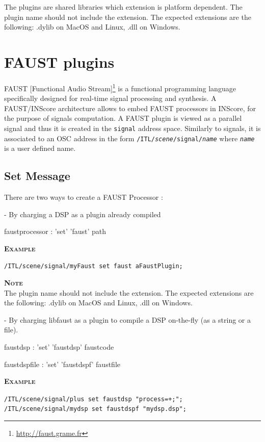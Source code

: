 \documentclass[a4paper,twoside]{report}
\newcommand{\sublevel}[1]	{\section{#1}}
\newcommand{\subsublevel}[1]	{\subsection{#1}}
\newcommand{\OSC}[1]		{\texttt{#1}}
\newcommand{\example}		{\textbf{\hspace{-1.5cm}\textbf{\textsc{Example }}}}
\newcommand{\note}	[1]		{\vspace{2mm}\textbf{\hspace{-0.9cm}\textbf{\textsc{Note #1}}}}
\let\olditemize\itemize
\let\oldenditemize\enditemize
\renewenvironment{itemize} 	{\olditemize \setlength{\itemsep}{1mm}}{\oldenditemize}
\newcommand{\sample}	[1]			{\vspace{-2mm}\begin{center}\colorbox{mygrey}{
								\begin{minipage}[t]{0.9\columnwidth} 
								{\small \texttt{#1}}
								\end{minipage}}\end{center}}
\begin{document}
The plugins are shared libraries which extension is platform dependent. The plugin name should not include the extension. The expected extensions are the following: .dylib on MacOS and Linux, .dll on Windows.



\sublevel{FAUST plugins}
\label{faust}

FAUST [Functional Audio Stream]\footnote{\url{http://faust.grame.fr}} is a functional programming language specifically designed for real-time signal processing and synthesis. A FAUST/INScore architecture allows to embed FAUST processors in INScore, for the purpose of signals computation. A FAUST plugin is viewed as a parallel signal and thus it is created in the \OSC{signal} address space. Similarly to signals, it is associated to an OSC address in the form \OSC{/ITL/\emph{scene}/signal/\emph{name}} where \OSC{\emph{name}} is a user defined name.

\subsublevel{Set Message}

There are two ways to create a FAUST Processor : 
\begin{itemize}
\item [1]- By charging a DSP as a plugin already compiled \\

\begin{rail}
faustprocessor : 'set' 'faust' path
\end{rail}

\example \\
\sample{/ITL/scene/signal/myFaust set faust aFaustPlugin;}

\note{} \\
The plugin name should not include the extension. The expected extensions are the following: .dylib on MacOS and Linux, .dll on Windows. \\

\item [2]- By charging libfaust as a plugin to compile a DSP on-the-fly  (as a string or a file). \\
\begin{rail}
faustdsp : 'set' 'faustdsp' faustcode
\end{rail}

\vspace{0.3cm}

\begin{rail}
faustdspfile : 'set' 'faustdspf' faustfile
\end{rail}

\example \\
\sample{/ITL/scene/signal/plus set faustdsp "process=+;"; \\
/ITL/scene/signal/mydsp set faustdspf "mydsp.dsp";
}

\end{itemize}
\end{document}
